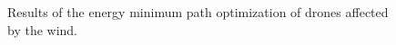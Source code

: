 \documentclass[journal]{./template/IEEEtran}
\begin{document}
\begin{figure}[ht]
\caption{Results of the energy minimum path optimization of drones affected by the wind.}
\label{fig: wind_opt}
\end{figure}
\end{document}
